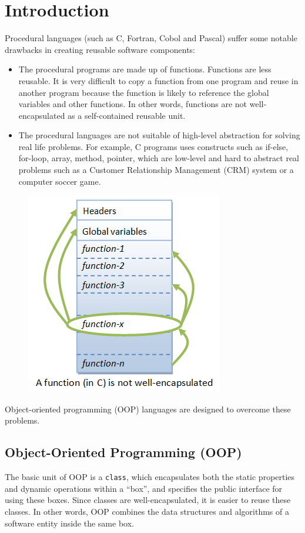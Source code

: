 \documentclass[11pt,a4paper]{article}
\author{TalentSprint}
\date{}
\begin{document}
\section*{Introduction}
Procedural languages (such as C, Fortran, Cobol and Pascal) suffer some notable drawbacks in creating reusable software components:
\begin{itemize}
\item The procedural programs are made up of functions. Functions are less reusable. It is very difficult to copy a function from one program and reuse in another program because the function is likely to reference the global variables and other functions. In other words, functions are not well-encapsulated as a self-contained reusable unit.

\item The procedural languages are not suitable of high-level abstraction for solving real life problems. For example, C programs uses constructs such as if-else, for-loop, array, method, pointer, which are low-level and hard to abstract real problems such as a Customer Relationship Management (CRM) system or a computer soccer game.
\end{itemize}

\begin{figure}[H]
\begin{center}
\includegraphics[scale=0.6]{OOP_CFunction.png}
\end{center}
\end{figure}
Object-oriented programming (OOP) languages are designed to overcome these problems.
\subsection*{Object-Oriented Programming (OOP)}
The basic unit of OOP is a \texttt{class}, which encapsulates both the static properties and dynamic operations within a ``box'', and specifies the public interface for using these boxes. Since classes are well-encapsulated, it is easier to reuse these classes. In other words, OOP combines the data structures and algorithms of a software entity inside the same box.
\end{document}
